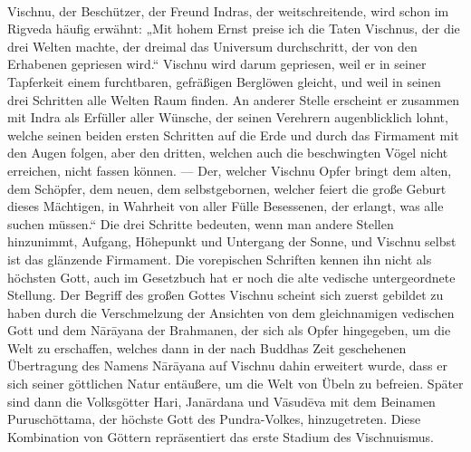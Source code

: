 \documentclass{article}
\begin{document}
\paragraph{}
Vischnu, der Beschützer, der Freund Indras, der weitschreitende, wird schon im Rigveda häufig erwähnt: „Mit hohem Ernst preise ich die Taten Vischnus, der die drei Welten machte, der dreimal das Universum durchschritt, der von den Erhabenen gepriesen wird.“ Vischnu wird darum gepriesen, weil er in seiner Tapferkeit einem furchtbaren, gefräßigen Berglöwen gleicht, und weil in seinen drei Schritten alle Welten Raum finden. An anderer Stelle erscheint er zusammen mit Indra als Erfüller aller Wünsche, der seinen Verehrern augenblicklich lohnt, welche seinen beiden ersten Schritten auf die Erde und durch das Firmament mit den Augen folgen, aber den dritten, welchen auch die beschwingten Vögel nicht erreichen, nicht fassen können. — Der, welcher Vischnu Opfer bringt dem alten, dem Schöpfer, dem neuen, dem selbstgebornen, welcher feiert die große Geburt dieses Mächtigen, in Wahrheit von aller Fülle Besessenen, der erlangt, was alle suchen müssen.“ Die drei Schritte bedeuten, wenn man andere Stellen hinzunimmt, Aufgang, Höhepunkt und Untergang der Sonne, und Vischnu selbst ist das glänzende Firmament. Die vorepischen Schriften kennen ihn nicht als höchsten Gott, auch im Gesetzbuch hat er noch die alte vedische untergeordnete Stellung. Der Begriff des großen Gottes Vischnu scheint sich zuerst gebildet zu haben durch die Verschmelzung der Ansichten von dem gleichnamigen vedischen Gott und dem N\={a}r\={a}yana der Brahmanen, der sich als Opfer hingegeben, um die Welt zu erschaffen, welches dann in der nach Buddhas Zeit geschehenen Übertragung des Namens N\={a}r\={a}yana auf Vischnu dahin erweitert wurde, dass er sich seiner göttlichen Natur entäußere, um die Welt von Übeln zu befreien. Später sind dann die Volksgötter Hari, Jan\={a}rdana und V\={a}sud\={e}va mit dem Beinamen Purusch\={o}ttama, der höchste Gott des Pundra-Volkes, hinzugetreten. Diese Kombination von Göttern repräsentiert das erste Stadium des Vischnuismus.
\end{document}
